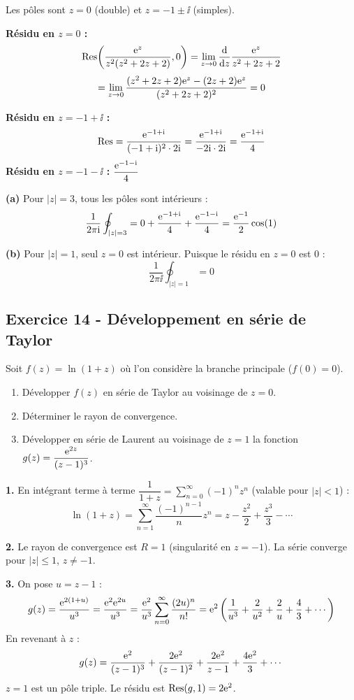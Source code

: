 \documentclass[12pt,a4paper]{article}
\begin{document}
\begin{boitecorrige}
Les pôles sont $z=0$ (double) et $z = -1\pm\ii$ (simples).

\textbf{Résidu en $z=0$ :}
\[
\operatorname{Res}\!\left(\frac{\mathrm{e}^z}{z^2(z^2+2z+2)}, 0\right)
= \lim_{z\to 0}\frac{\mathrm{d}}{\mathrm{d} z}\frac{\mathrm{e}^z}{z^2+2z+2}
\]
\[
= \lim_{z\to 0}\frac{(z^2+2z+2)\mathrm{e}^z - (2z+2)\mathrm{e}^z}{(z^2+2z+2)^2} = 0
\]

\textbf{Résidu en $z=-1+\ii$ :}
\[
\operatorname{Res} = \frac{\mathrm{e}^{-1+\mathrm{i}}}{(-1+\mathrm{i})^2\cdot 2\mathrm{i}} = \frac{\mathrm{e}^{-1+\mathrm{i}}}{-2\mathrm{i}\cdot 2\mathrm{i}} = \frac{\mathrm{e}^{-1+\mathrm{i}}}{4}
\]
\textbf{Résidu en $z=-1-\ii$ :} $\dfrac{\mathrm{e}^{-1-\mathrm{i}}}{4}$

\textbf{(a)} Pour $|z|=3$, tous les pôles sont intérieurs :
\[
\frac{1}{2\pi\mathrm{i}}\oint_{|z|=3} = 0 + \frac{\mathrm{e}^{-1+\mathrm{i}}}{4} + \frac{\mathrm{e}^{-1-\mathrm{i}}}{4} = \frac{\mathrm{e}^{-1}}{2}\cos(1)
\]

\textbf{(b)} Pour $|z|=1$, seul $z=0$ est intérieur. Puisque le résidu en $z=0$ est $0$ :
\[
\frac{1}{2\pi\ii}\oint_{|z|=1} = 0
\]
\end{boitecorrige}

\subsection*{Exercice 14 - Développement en série de Taylor \niveau{\moyen}}

\begin{boiteexercice}
Soit $f(z) = \ln(1+z)$ où l'on considère la branche principale ($f(0)=0$).
\begin{enumerate}
  \item Développer $f(z)$ en série de Taylor au voisinage de $z=0$.
  \item Déterminer le rayon de convergence.
  \item Développer en série de Laurent au voisinage de $z=1$ la fonction $g(z) = \dfrac{\mathrm{e}^{2z}}{(z-1)^3}$.
\end{enumerate}
\end{boiteexercice}

\begin{boitecorrige}
\textbf{1.} En intégrant terme à terme $\dfrac{1}{1+z} = \sum_{n=0}^\infty (-1)^n z^n$ (valable pour $|z|<1$) :
\[
\ln(1+z) = \sum_{n=1}^\infty \frac{(-1)^{n-1}}{n}z^n = z - \frac{z^2}{2} + \frac{z^3}{3} - \cdots
\]

\textbf{2.} Le rayon de convergence est $R=1$ (singularité en $z=-1$). La série converge pour $|z|\leq 1$, $z\neq -1$.

\textbf{3.} On pose $u = z-1$ :
\[
g(z) = \frac{\mathrm{e}^{2(1+u)}}{u^3} = \frac{\mathrm{e}^2 \mathrm{e}^{2u}}{u^3} = \frac{\mathrm{e}^2}{u^3}\sum_{n=0}^\infty\frac{(2u)^n}{n!}
= \mathrm{e}^2\left(\frac{1}{u^3} + \frac{2}{u^2} + \frac{2}{u} + \frac{4}{3} + \cdots\right)
\]
En revenant à $z$ :
\[
g(z) = \frac{\mathrm{e}^2}{(z-1)^3} + \frac{2\mathrm{e}^2}{(z-1)^2} + \frac{2\mathrm{e}^2}{z-1} + \frac{4\mathrm{e}^2}{3} + \cdots
\]
$z=1$ est un pôle triple. Le résidu est $\operatorname{Res}(g,1) = 2\mathrm{e}^2$.
\end{boitecorrige}
\end{document}
